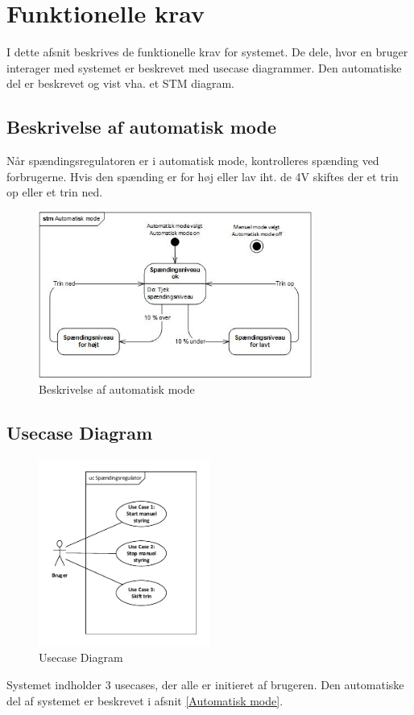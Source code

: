 
\section{Funktionelle krav}
I dette afsnit beskrives de funktionelle krav for systemet. De dele, hvor en bruger interager med systemet er beskrevet med usecase diagrammer. Den automatiske del er beskrevet og vist vha. et STM diagram.

\subsection{Beskrivelse af automatisk mode}
\label{Afsnit: Automatisk mode}

Når spændingsregulatoren er i automatisk mode, kontrolleres spænding ved forbrugerne. Hvis den spænding er for høj eller lav iht. de 4V skiftes der et trin op eller et trin ned.  
\begin{figure}[htbp] %
	\centering
	\includegraphics[width=0.8\textwidth]{Figure/STM}
	\caption{Beskrivelse af automatisk mode}
	\label{fig:automode}
\end{figure}

\subsection{Usecase Diagram}

\begin{figure}[htbp] %
	\centering
	\includegraphics[width=0.5\textwidth]{Figure/UsecaseDiagram}
	\caption{Usecase Diagram}
	\label{fig:UsecaseDiagram}
\end{figure}
Systemet indholder 3 usecases, der alle er initieret af brugeren. Den automatiske del af systemet er beskrevet i afsnit \ref{Automatisk mode}.

